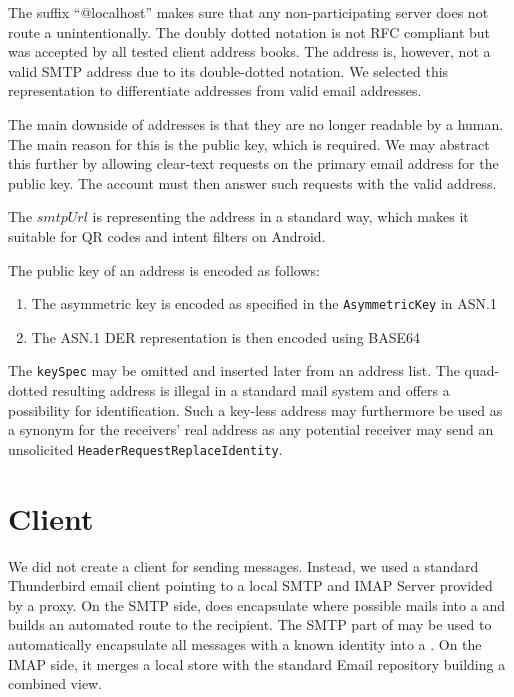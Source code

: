 The suffix ``@localhost'' makes sure that any non-participating server does not route a \VortexMessage{} unintentionally. The doubly dotted notation is not RFC compliant but was accepted by all tested client address books. The address is, however, not a valid SMTP address due to its double-dotted notation. We selected this representation to differentiate \MessageVortex{} addresses from valid email addresses.

The main downside of \MessageVortex{} addresses is that they are no longer readable by a human. The main reason for this is the public key, which is required. We may abstract this further by allowing clear-text requests on the primary email address for the public key. The \MessageVortex{} account must then answer such requests with the valid \MessageVortex{} address.

The $smtpUrl$ is representing the address in a standard way, which makes it suitable for QR codes and intent filters on Android.

The public key of an address is encoded as follows:
\begin{enumerate}
	\item The asymmetric key is encoded as specified in the \texttt{AsymmetricKey} in ASN.1
	\item The ASN.1 DER representation is then encoded using BASE64
\end{enumerate}    

The \texttt{keySpec} may be omitted and inserted later from an address list. The quad-dotted resulting address is illegal in a standard mail system and offers a possibility for identification. Such a key-less address may furthermore be used as a synonym for the receivers' real address as any potential receiver may send an unsolicited \texttt{HeaderRequestReplaceIdentity}.

\section{Client}
We did not create a \MessageVortex{} client for sending messages. Instead, we used a standard Thunderbird email client pointing to a local SMTP and IMAP Server provided by a \MessageVortex{} proxy. On the SMTP side, \MessageVortex{} does encapsulate where possible mails into a \VortexMessage{} and builds an automated route to the recipient. The SMTP part of \VortexMessage{} may be used to automatically encapsulate all messages with a known \MessageVortex{} identity into a \VortexMessage. On the IMAP side, it merges a local \VortexMessage{} store with the standard Email repository building a combined view.

